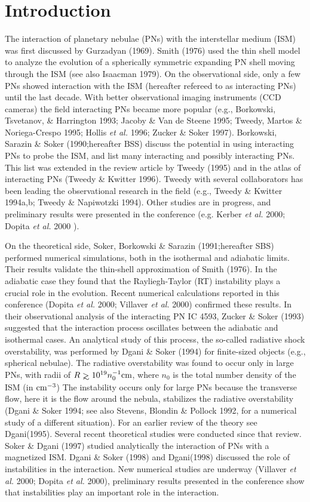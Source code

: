 \section{Introduction}
The interaction of planetary nebulae (PNs) with the interstellar medium (ISM)
was first discussed by Gurzadyan (1969). Smith (1976) used the thin shell model
to analyze the evolution of a spherically symmetric expanding PN shell
moving through the ISM (see also Isaacman 1979).
On the observational side, only a few PNs showed interaction with the ISM
(hereafter refereed to as interacting PNs) until the last decade.
With better observational imaging instruments (CCD cameras) the field
interacting PNs became more popular
(e.g., Borkowski, Tsvetanov, \& Harrington 1993; Jacoby \& Van de Steene 1995;
Tweedy, Martos \& Noriega-Crespo 1995; Hollis {\it et al.} 1996;
Zucker \& Soker 1997). Borkowski, Sarazin \& Soker (1990;hereafter BSS) discuss
the potential in using interacting PNs to probe the ISM, and list many
interacting and possibly interacting PNs.
This list was extended in the review article by Tweedy (1995)
and in the atlas of interacting PNs (Tweedy \& Kwitter 1996). Tweedy
with several collaborators has been leading the observational research
in the field (e.g., Tweedy \& Kwitter 1994a,b; Tweedy \& Napiwotzki 1994).
Other studies are in progress, and preliminary
results were presented in the conference (e.g. Kerber {\it et al.} 2000;
Dopita {\it et al.} 2000 ).

On the theoretical side, Soker, Borkowski \& Sarazin (1991;hereafter
SBS) performed numerical simulations, both in the isothermal and adiabatic
limits.
Their results validate the thin-shell approximation of Smith (1976).
In the adiabatic case they found that the Rayliegh-Taylor (RT)
instability plays a crucial role in the evolution.
Recent numerical calculations reported in this conference
(Dopita {\it et al.} 2000; Villaver {\it et al.} 2000) confirmed these
results. In their observational analysis of the interacting PN IC 4593,
Zucker \& Soker (1993) suggested that the interaction process oscillates
between the adiabatic and isothermal cases.
An analytical study of this process, the so-called radiative shock
overstability, was performed by Dgani \& Soker (1994) for finite-sized
objects (e.g., spherical nebulae).
The radiative overstability was found to occur only in large
PNs, with radii of $R \mathrel{>\kern-1.0em\lower0.9ex\hbox{$\sim$}} 10^{19} n_0^{-1} \rm{cm}$, where $n_0$ is the
total number density of the ISM (in $\rm{cm}^{-3}$)
The instability occurs only for large PNs because the transverse
flow, here it is the flow around the nebula, stabilizes the radiative
overstability (Dgani \& Soker 1994; see also
Stevens, Blondin \& Pollock 1992, for a numerical study of a different
situation).
For an earlier review of the theory see Dgani(1995).
Several recent theoretical studies were conducted since that review.
Soker \& Dgani (1997) studied analytically the interaction
of PNs with a magnetized ISM. Dgani \& Soker (1998) and Dgani(1998) discussed
the role of instabilities in the interaction.
New numerical studies are underway (Villaver {\it et al.} 2000;
Dopita {\it et al.} 2000), preliminary results presented in the conference
show that instabilities play an important role in the interaction.

